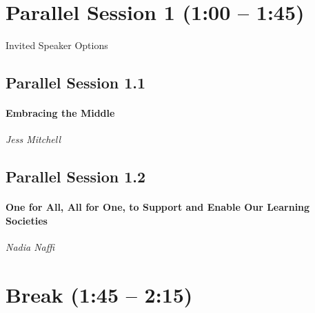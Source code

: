 \documentclass[
]{book}
\begin{document}
\hypertarget{parallel-session-1-100-145}{%
\section*{Parallel Session 1 (1:00 -- 1:45)}\label{parallel-session-1-100-145}}

Invited Speaker Options

\hypertarget{parallel-session-1.1}{%
\subsection*{Parallel Session 1.1}\label{parallel-session-1.1}}

\begin{wp}
\hypertarget{embracing-the-middle}{%
\paragraph{\texorpdfstring{\textbf{Embracing the
Middle}}{Embracing the Middle}}\label{embracing-the-middle}}

\emph{Jess Mitchell}
\end{wp}

\hypertarget{parallel-session-1.2}{%
\subsection*{Parallel Session 1.2}\label{parallel-session-1.2}}

\begin{wp}
\hypertarget{one-for-all-all-for-one-to-support-and-enable-our-learning-societies}{%
\paragraph{\texorpdfstring{\textbf{One for All, All for One, to Support
and Enable Our Learning
Societies}}{One for All, All for One, to Support and Enable Our Learning Societies}}\label{one-for-all-all-for-one-to-support-and-enable-our-learning-societies}}

\emph{Nadia Naffi}
\end{wp}

\hypertarget{break-145-215}{%
\section*{Break (1:45 -- 2:15)}\label{break-145-215}}
\end{document}
